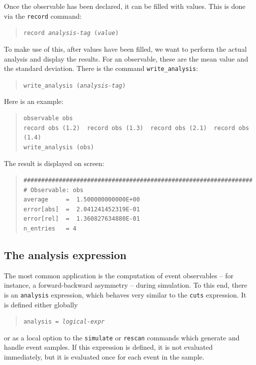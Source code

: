 \documentclass[12pt]{book}
\newcommand{\ttt}[1]{\texttt{#1}}
\begin{document}
Once the observable has been declared, it can be filled with values.  This is
done via the \ttt{record} command:
\begin{quote}
  \begin{footnotesize}
\ttt{record \emph{analysis-tag} (\emph{value})}
  \end{footnotesize}
\end{quote}
To make use of this, after values have been filled, we want to perform the
actual analysis and display the results.  For an observable, these are the
mean value and the standard deviation.  There is the command
\ttt{write\_analysis}:
\begin{quote}
  \begin{footnotesize}
\ttt{write\_analysis (\emph{analysis-tag})}
  \end{footnotesize}
\end{quote}

Here is an example:
\begin{quote}
  \begin{footnotesize}
\begin{verbatim}
observable obs
record obs (1.2)  record obs (1.3)  record obs (2.1)  record obs (1.4)
write_analysis (obs)
\end{verbatim}
  \end{footnotesize}
\end{quote}
The result is displayed on screen:
\begin{quote}
  \begin{footnotesize}
\begin{verbatim}
###############################################################################
# Observable: obs
average     =  1.500000000000E+00
error[abs]  =  2.041241452319E-01
error[rel]  =  1.360827634880E-01
n_entries   = 4
\end{verbatim}
  \end{footnotesize}
\end{quote}


\subsection{The analysis expression}
\label{subsec:analysis}

The most common application is the computation of event observables -- for
instance, a forward-backward asymmetry -- during simulation.  To this end,
there is an \ttt{analysis} expression, which behaves very similar to the
\ttt{cuts} expression.  It is defined either globally
\begin{quote}
  \begin{footnotesize}
    \ttt{analysis = \emph{logical-expr}}
  \end{footnotesize}
\end{quote}
or as a local option to the \ttt{simulate} or \ttt{rescan} commands which
generate and handle event samples.  If this expression is defined, it is not
evaluated immediately, but it is evaluated once for each event in the sample.
\end{document}
